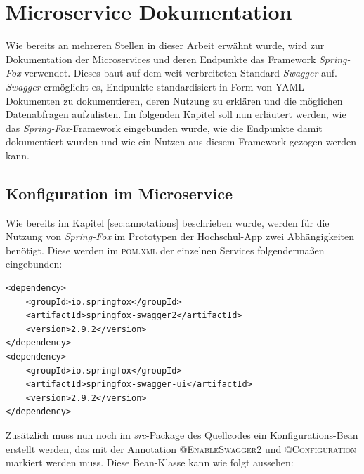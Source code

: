 \chapter{Microservice Dokumentation}
\label{sec:microserviceswagger}

Wie bereits an mehreren Stellen in dieser Arbeit erwähnt wurde, wird zur Dokumentation der Microservices und deren Endpunkte das Framework \textit{Spring-Fox} verwendet. Dieses baut auf dem weit verbreiteten Standard \textit{Swagger} auf. \textit{Swagger} ermöglicht es, Endpunkte standardisiert in Form von \ac{YAML}-Dokumenten zu dokumentieren, deren Nutzung zu erklären und die möglichen Datenabfragen aufzulisten. Im folgenden Kapitel soll nun erläutert werden, wie das \textit{Spring-Fox}-Framework eingebunden wurde, wie die Endpunkte damit dokumentiert wurden und wie ein Nutzen aus diesem Framework gezogen werden kann.

\section{Konfiguration im Microservice}

Wie bereits im Kapitel \ref{sec:annotations} beschrieben wurde, werden für die Nutzung von \textit{Spring-Fox} im Prototypen der Hochschul-\ac{App} zwei Abhängigkeiten benötigt. Diese werden im \textsc{pom.xml} der einzelnen Services folgendermaßen eingebunden:

\begin{lstlisting}[caption={Einbinden der \textit{Spring-Fox}-Abhängigkeiten}]
<dependency>
    <groupId>io.springfox</groupId>
    <artifactId>springfox-swagger2</artifactId>
    <version>2.9.2</version>
</dependency>
<dependency>
    <groupId>io.springfox</groupId>
    <artifactId>springfox-swagger-ui</artifactId>
    <version>2.9.2</version>
</dependency>
\end{lstlisting}

Zusätzlich muss nun noch im \textit{src}-Package des Quellcodes ein Konfigurations-Bean erstellt werden, das mit der Annotation \textsc{@EnableSwagger2} und \textsc{@Configuration} markiert werden muss. Diese Bean-Klasse kann wie folgt aussehen:

